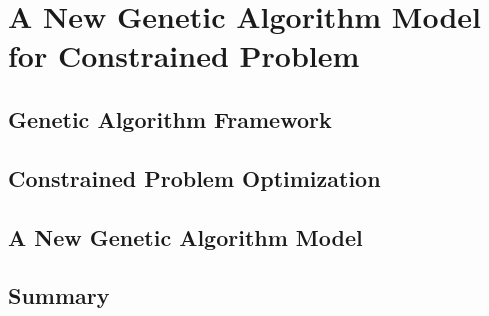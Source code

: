 
\chapter{A New Genetic Algorithm Model for Constrained Problem} %

\label{Chapter3} %


\section{Genetic Algorithm Framework}
\section{Constrained Problem Optimization}

\section{A New Genetic Algorithm Model}
\section{Summary}

